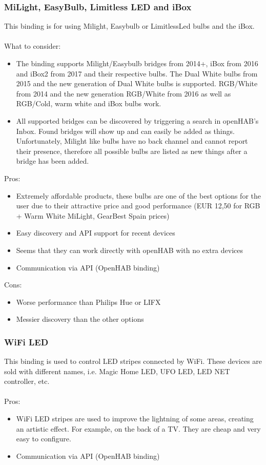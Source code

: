 \subsubsection{MiLight, EasyBulb, Limitless LED and iBox}
This binding is for using Milight, Easybulb or LimitlessLed bulbs and the iBox.\\~\\
What to consider:
\begin{itemize}
	\item The binding supports Milight/Easybulb bridges from 2014+, iBox from 2016 and iBox2 from 2017 and their respective bulbs.
	The Dual White bulbs from 2015 and the new generation of Dual White bulbs is supported. RGB/White from 2014 and the
	new generation RGB/White from 2016 as well as RGB/Cold, warm white and iBox bulbs work.
	\item All supported bridges can be discovered by triggering a search in openHAB’s Inbox. Found bridges will show up and can
	easily be added as things. Unfortunately, Milight like bulbs have no back channel and cannot report their presence, therefore all
	possible bulbs are listed as new things after a bridge has been added.
\end{itemize}
Pros:
\begin{itemize}
	\item Extremely affordable products, these bulbs are one of the best options for the user due to their attractive price and good
	performance (EUR 12,50 for RGB + Warm White MiLight, GearBest Spain prices)
	\item Easy discovery and API support for recent devices
	\item Seems that they can work directly with openHAB with no extra devices
	\item Communication via API (OpenHAB binding)
\end{itemize}
Cons:
\begin{itemize}
	\item Worse performance than Philips Hue or LIFX
	\item Messier discovery than the other options
\end{itemize}

\subsubsection{WiFi LED}
This binding is used to control LED stripes connected by WiFi. These devices are sold with different names, i.e. Magic Home LED,
UFO LED, LED NET controller, etc.\\~\\
Pros:
\begin{itemize}
	\item WiFi LED stripes are used to improve the lightning of some areas, creating an artistic effect. For example, on the back of a
	TV. They are cheap and very easy to configure.
	\item Communication via API (OpenHAB binding)
\end{itemize}

